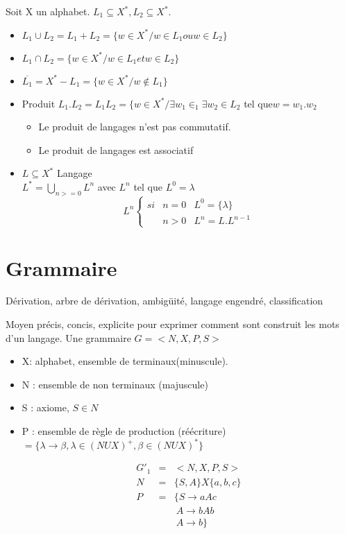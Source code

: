 	Soit X un alphabet. $L_1 \subseteq X^*, L_2 \subseteq X^*$.
	\begin{itemize}
		\item $L_1 \cup L_2 = L_1 + L_2 = \{w \in X^*/w \in L_1 ou w\in L_2\}$
		\item $L_1 \cap L_2 = \{w \in X^*/w\in L_1 et w\in L_2\}$
		\item $\overline{L_1} = X^* - L_1 = \{w \in X^* / w \not\in L_1\}$
		\item Produit $L_1 . L_2 = L_1 L_2 = \{w\in X^* / \exists w_1 \in _1 \exists w_2 \in L_2$ tel que$w = w_1 . w_2$ 
	\begin{attention}
		\begin{itemize}
			\item Le produit de langages n'est pas commutatif.
			\item Le produit de langages est associatif
		\end{itemize}
	\end{attention}

\item $L \subseteq X^*$ Langage\\
$L^* = \bigcup_{n >= 0}L^n$ avec $L^n$ tel que $L^0 = \lambda$
	\begin{displaymath}
	L^n
	\left\{\begin{array}{ccc}si & n=0 & L^0=\{\lambda\}\\
		\;&n>0&L^n=L.L^{n-1}
	\end{array}\right.
	\end{displaymath}
	\end{itemize}
	\section{Grammaire}
		Dérivation, arbre de dérivation, ambigüité, langage engendré, classification

		\begin{definition}
			Moyen précis, concis, explicite pour exprimer comment sont construit les mots d'un langage. Une grammaire $G=<N, X, P, S>$\\
			\begin{itemize}
				\item X: alphabet, ensemble de terminaux(minuscule).
				\item N : ensemble de non terminaux (majuscule)
				\item S : axiome, $S\in N$
				\item P : ensemble de règle de production (réécriture) $=\{\lambda \rightarrow \beta, \lambda \in(NUX)^+, \beta\in(NUX)^*\}$
					\begin{exemple}
						\begin{eqnarray*}
							G'_1 &=&  <N,X,P,S>\\
							N &=&  \{S,A\} X\{a,b,c\}\\
							P&=& \{S \rightarrow aAc\\
							&&\ A \rightarrow bAb\\
							&&\ A \rightarrow b\}
						\end{eqnarray*}
					\end{exemple}
			\end{itemize}
		\end{definition}
